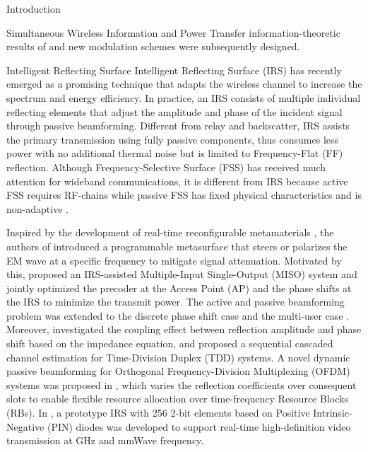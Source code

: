 \documentclass[journal]{IEEEtran}
\begin{document}
\begin{section}{Introduction}
\begin{subsection}{Simultaneous Wireless Information and Power Transfer}
information-theoretic results of \cite{Varasteh2020} and new modulation schemes were subsequently designed.
		\end{subsection}


		\begin{subsection}{Intelligent Reflecting Surface}
			Intelligent Reflecting Surface (IRS) has recently emerged as a promising technique that adapts the wireless channel to increase the spectrum and energy efficiency. In practice, an IRS consists of multiple individual reflecting elements that adjust the amplitude and phase of the incident signal through passive beamforming. Different from relay and backscatter, IRS assists the primary transmission using fully passive components, thus consumes less power with no additional thermal noise but is limited to Frequency-Flat (FF) reflection. Although Frequency-Selective Surface (FSS) has received much attention for wideband communications, it is different from IRS because active FSS requires RF-chains \cite{Kim2006} while passive FSS has fixed physical characteristics and is non-adaptive \cite{Anwar2018}.

			Inspired by the development of real-time reconfigurable metamaterials \cite{Cui2014}, the authors of \cite{Liaskos2018} introduced a programmable metasurface that steers or polarizes the EM wave at a specific frequency to mitigate signal attenuation. Motivated by this, \cite{Wu2018} proposed an IRS-assisted Multiple-Input Single-Output (MISO) system and jointly optimized the precoder at the Access Point (AP) and the phase shifts at the IRS to minimize the transmit power. The active and passive beamforming problem was extended to the discrete phase shift case \cite{Wu2019a} and the multi-user case \cite{Wu2019}. Moreover, \cite{Abeywickrama2019} investigated the coupling effect between reflection amplitude and phase shift based on the impedance equation, and \cite{Nadeem2019} proposed a sequential cascaded channel estimation for Time-Division Duplex (TDD) systems.	A novel dynamic passive beamforming for Orthogonal Frequency-Division Multiplexing (OFDM) systems was proposed in \cite{Yang2020}, which varies the reflection coefficients over consequent slots to enable flexible resource allocation over time-frequency Resource Blocks (RBs). In \cite{Dai2020}, a prototype IRS with \num{256} \num{2}-bit elements based on Positive Intrinsic-Negative (PIN) diodes was developed to support real-time high-definition video transmission at \si{GHz} and mmWave frequency.
		\end{subsection}



\end{section}
\end{document}
